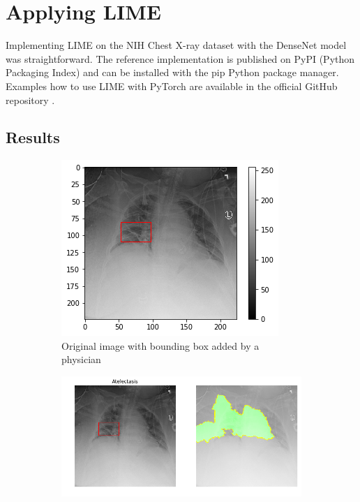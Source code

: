 \section{Applying LIME}
Implementing LIME on the NIH Chest X-ray dataset with the DenseNet model was straightforward. The reference implementation is published on PyPI (Python Packaging Index) and can be installed with the pip Python package manager. Examples how to use LIME with PyTorch are available in the official GitHub repository \cite{limegithub}.


\subsection{Results}


\begin{figure}[H]
    \centering
    \begin{subfigure}[t]{.45\textwidth}
        \centering
        \includegraphics[width=\linewidth]{chapters/03_classification/images/rise0_bbox.png}
        \caption{Original image with bounding box added by a physician}
    \end{subfigure}\hspace{1cm}%
    \begin{subfigure}[t]{.45\textwidth}
        \centering
        \includegraphics[width=\linewidth]{chapters/03_classification/images/lime_0.png}

\end{subfigure}
\end{figure}
